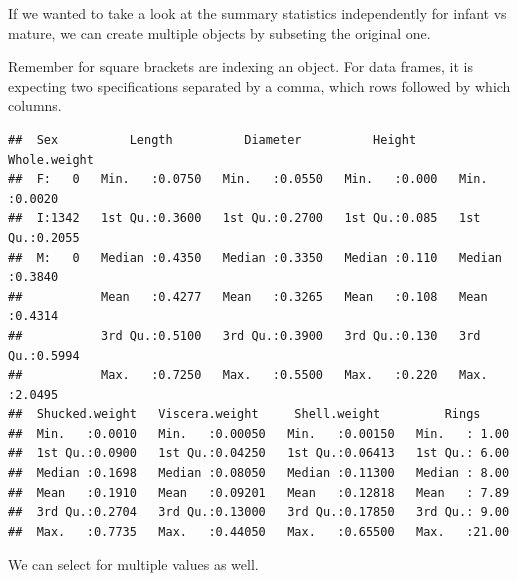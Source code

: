 \documentclass[
]{book}
\newenvironment{Shaded}{\begin{snugshade}}{\end{snugshade}}
\newcommand{\CommentTok}[1]{\textcolor[rgb]{0.56,0.35,0.01}{\textit{#1}}}
\newcommand{\FunctionTok}[1]{\textcolor[rgb]{0.13,0.29,0.53}{\textbf{#1}}}
\newcommand{\NormalTok}[1]{#1}
\newcommand{\OtherTok}[1]{\textcolor[rgb]{0.56,0.35,0.01}{#1}}
\newcommand{\SpecialCharTok}[1]{\textcolor[rgb]{0.81,0.36,0.00}{\textbf{#1}}}
\newcommand{\StringTok}[1]{\textcolor[rgb]{0.31,0.60,0.02}{#1}}
\begin{document}
If we wanted to take a look at the summary statistics independently for infant vs mature, we can create multiple objects by subseting the original one.

Remember for square brackets are indexing an object. For data frames, it is expecting two specifications separated by a comma, which rows followed by which columns.

\begin{Shaded}
\end{Shaded}

\begin{verbatim}
##  Sex          Length          Diameter          Height       Whole.weight   
##  F:   0   Min.   :0.0750   Min.   :0.0550   Min.   :0.000   Min.   :0.0020  
##  I:1342   1st Qu.:0.3600   1st Qu.:0.2700   1st Qu.:0.085   1st Qu.:0.2055  
##  M:   0   Median :0.4350   Median :0.3350   Median :0.110   Median :0.3840  
##           Mean   :0.4277   Mean   :0.3265   Mean   :0.108   Mean   :0.4314  
##           3rd Qu.:0.5100   3rd Qu.:0.3900   3rd Qu.:0.130   3rd Qu.:0.5994  
##           Max.   :0.7250   Max.   :0.5500   Max.   :0.220   Max.   :2.0495  
##  Shucked.weight   Viscera.weight     Shell.weight         Rings      
##  Min.   :0.0010   Min.   :0.00050   Min.   :0.00150   Min.   : 1.00  
##  1st Qu.:0.0900   1st Qu.:0.04250   1st Qu.:0.06413   1st Qu.: 6.00  
##  Median :0.1698   Median :0.08050   Median :0.11300   Median : 8.00  
##  Mean   :0.1910   Mean   :0.09201   Mean   :0.12818   Mean   : 7.89  
##  3rd Qu.:0.2704   3rd Qu.:0.13000   3rd Qu.:0.17850   3rd Qu.: 9.00  
##  Max.   :0.7735   Max.   :0.44050   Max.   :0.65500   Max.   :21.00
\end{verbatim}

We can select for multiple values as well.

\begin{Shaded}
\end{Shaded}
\end{document}
